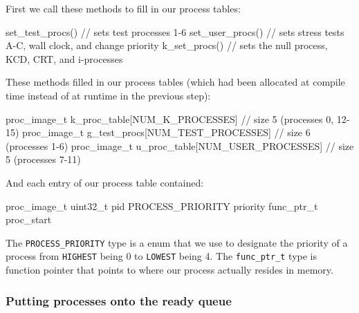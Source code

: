 \documentclass[se]{uw-wkrpt}
\begin{document}
First we call these methods to fill in our process tables:
\begin{code}
set_test_procs() // sets test processes 1-6
set_user_procs() // sets stress tests A-C, wall clock, and change priority
k_set_procs() // sets the null process, KCD, CRT, and i-processes
\end{code}

These methods filled in our process tables (which had been allocated at compile time instead of at runtime in the previous step):
\begin{code}
proc_image_t k_proc_table[NUM_K_PROCESSES] // size 5 (processes 0, 12-15)
proc_image_t g_test_procs[NUM_TEST_PROCESSES] // size 6 (processes 1-6)
proc_image_t u_proc_table[NUM_USER_PROCESSES] // size 5 (processes 7-11)
\end{code}

And each entry of our process table contained:
\begin{code}
proc_image_t
    uint32_t pid
    PROCESS_PRIORITY priority
    func_ptr_t proc_start
\end{code}

The \texttt{PROCESS\_PRIORITY} type is a enum that we use to designate the priority of a process from \texttt{HIGHEST} being 0 to \texttt{LOWEST} being 4. The \texttt{func\_ptr\_t} type is function pointer that points to where our process actually resides in memory. 

\subsubsection{Putting processes onto the ready queue}
\end{document}
